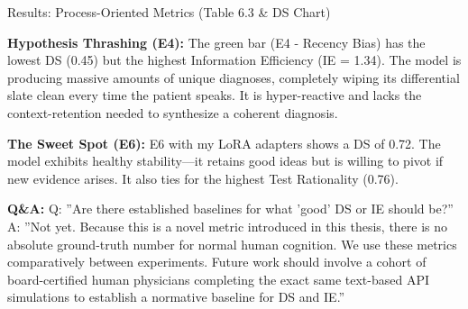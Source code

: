 \begin{frame}{Results: Process-Oriented Metrics (Table 6.3 \& DS Chart)}
{\textbf{Hypothesis Thrashing (E4):} The green bar (E4 - Recency Bias) has the lowest DS (0.45) but the highest Information Efficiency (IE = 1.34). The model is producing massive amounts of unique diagnoses, completely wiping its differential slate clean every time the patient speaks. It is hyper-reactive and lacks the context-retention needed to synthesize a coherent diagnosis.

\textbf{The Sweet Spot (E6):} E6 with my LoRA adapters shows a DS of 0.72. The model exhibits healthy stability—it retains good ideas but is willing to pivot if new evidence arises. It also ties for the highest Test Rationality (0.76).

\textbf{Q\&A:}
Q: ''Are there established baselines for what 'good' DS or IE should be?''
A: ''Not yet. Because this is a novel metric introduced in this thesis, there is no absolute ground-truth number for normal human cognition. We use these metrics comparatively between experiments. Future work should involve a cohort of board-certified human physicians completing the exact same text-based API simulations to establish a normative baseline for DS and IE.''
}
\end{frame}

